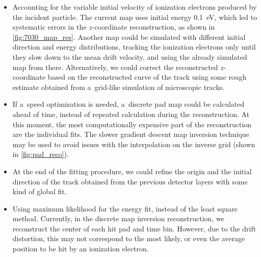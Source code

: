 		\begin{itemize}
			\item Accounting for the variable initial velocity of ionization electrons produced by the incident particle. The current map uses initial energy \qty{0.1}{\eV}, which led to systematic errors in the $z$\nobreakdash-coordinate reconstruction, as shown in \cref{fig:7030_map_res}. Another map could be simulated with different initial direction and energy distributions, tracking the ionization electrons only until they slow down to the mean drift velocity, and using the already simulated map from there. Alternatively, we could correct the reconstructed $z$\nobreakdash-coordinate based on the reconstructed curve of the track using some rough estimate obtained from a~grid-like simulation of microscopic tracks.
			\item If a~speed optimization is needed, a~discrete pad map could be calculated ahead of time, instead of repeated calculation during the reconstruction. At this moment, the most computationally expensive part of the reconstruction are the individual fits. The slower gradient descent map inversion technique may be used to avoid issues with the interpolation on the inverse grid (shown in \cref{fig:pad_reco}).
			\item At the end of the fitting procedure, we could refine the origin and the initial direction of the track obtained from the previous detector layers with some kind of global fit.
			\item Using maximum likelihood for the energy fit, instead of the least square method. Currently, in the discrete map inversion reconstruction, we reconstruct the center of each hit pad and time bin. However, due to the drift distortion, this may not correspond to the most likely, or even the average position to be hit by an ionization electron.
			

\end{itemize}
